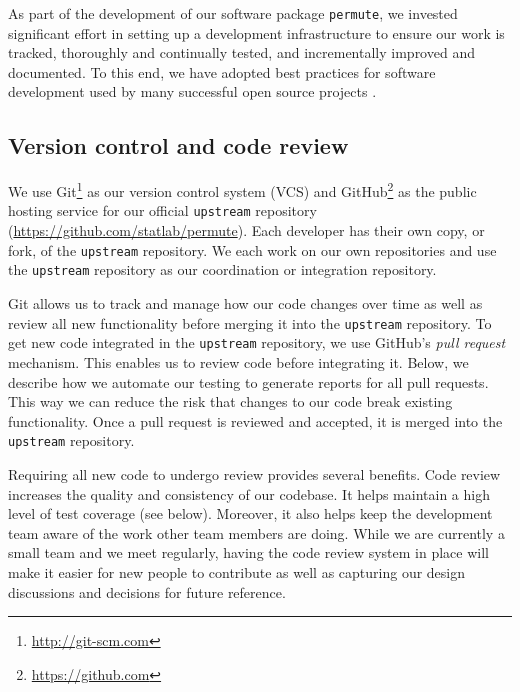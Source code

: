 \documentclass[]{article}
\begin{document}

As part of the development of our software package \texttt{permute}, we
invested significant effort in setting up a development infrastructure to
ensure our work is tracked, thoroughly and continually tested, and
incrementally improved and documented.
To this end, we have adopted best practices for software development used by
many successful open source projects \cite{millman2014developing}.

\subsection{\label{sec:vc}Version control and code review}

We use Git\footnote{\url{http://git-scm.com}} as our version control system
(VCS) and GitHub\footnote{\url{https://github.com}} as the public hosting
service for our official \texttt{upstream} repository
(\url{https://github.com/statlab/permute}).
Each developer has their own copy, or fork, of the \texttt{upstream}
repository.
We each work on our own repositories and use the \texttt{upstream} repository
as our coordination or integration repository.

Git allows us to track and manage how our code changes over time as well as
review all new functionality before merging it into the \texttt{upstream}
repository.
To get new code integrated in the \texttt{upstream} repository, we use GitHub's
\emph{pull request} mechanism.
This enables us to review code before integrating it.
Below, we describe how we automate our testing to generate reports for all pull
requests.
This way we can reduce the risk that changes to our code break existing
functionality.
Once a pull request is reviewed and accepted, it is merged into the
\texttt{upstream} repository.

Requiring all new code to undergo review provides several benefits.
Code review increases the quality and consistency of our codebase.
It helps maintain a high level of test coverage (see below).
Moreover, it also helps keep the development team aware of the work other team
members are doing.
While we are currently a small team and we meet regularly, having the code
review system in place will make it easier for new people to contribute as well
as capturing our design discussions and decisions for future reference.
\end{document}

